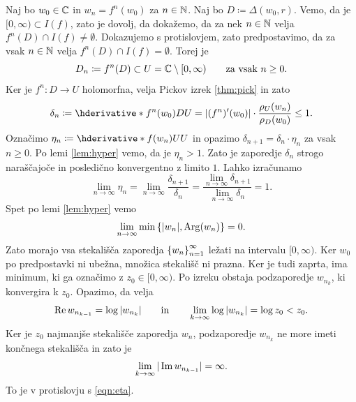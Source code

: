 \begin{dokaz}
    Naj bo \(w_0 \in \mathbb C\) in \(w_n = f^n (w_0)\) za \(n \in \mathbb N\). Naj bo \(D \coloneq \Delta (w_0, r)\). Vemo, da je \([0, \infty) \subset I (f)\), zato je dovolj, da dokažemo, da za nek \(n \in \mathbb N\) velja \(f^n (D) \cap I (f) \neq \emptyset\). Dokazujemo s protislovjem, zato predpostavimo, da za vsak \(n \in \mathbb N\) velja \(f^n (D) \cap I (f) = \emptyset\). Torej je
    \[D_n \coloneq f^n (D) \subset U = \mathbb C \setminus [0, \infty) \qquad \text{za vsak } n \geq 0.\]
    Ker je \(f^n \colon D \to U\) holomorfna, velja Pickov izrek \ref{thm:pick} in zato
    \[\delta_n \coloneq \hder{f^n (w_0)}{D}{U} = |(f^n)' (w_0)| \cdot \frac{\rho_U (w_n)}{\rho_D (w_0)} \leq 1.\]
    Označimo \(\eta_n \coloneq \hder{f (w_n)}{U}{U}\) in opazimo \(\delta_{n + 1} = \delta_n \cdot \eta_n\) za vsak \(n \geq 0\). Po lemi \ref{lem:hyper} vemo, da je \(\eta_n > 1\). Zato je zaporedje \(\delta_n\) strogo naraščajoče in posledično konvergentno z limito \(\num{1}\). Lahko izračunamo
    \[\lim_{n \to \infty} \eta_n = \lim_{n \to \infty} \frac{\delta_{n + 1}}{\delta_n} = \frac{\lim_{n \to \infty} \delta_{n + 1}}{\lim_{n \to \infty} \delta_n} = 1.\]
    Spet po lemi \ref{lem:hyper} vemo
    \[\lim_{n \to \infty} \min \left\{ |w_n|, \operatorname{Arg} (w_n) \right\} = 0.\]
    Zato morajo vsa stekališča zaporedja \(\left\{ w_n \right\}_{n = 1}^{\infty}\) ležati na intervalu \([0, \infty)\). Ker \(w_0\) po predpostavki ni ubežna, množica stekališč ni prazna. Ker je tudi zaprta, ima minimum, ki ga označimo z \(z_0 \in [0, \infty)\). Po izreku obstaja podzaporedje \(w_{n_{k}}\), ki konvergira k \(z_0\). Opazimo, da velja
    \[\operatorname{Re} w_{n_{k - 1}} = \log |w_{n_{k}}| \qquad \text{in} \qquad \lim_{k \to \infty} \log |w_{n_{k}}| = \log z_0 < z_0.\]
    Ker je \(z_0\) najmanjše stekališče zaporedja \(w_n\), podzaporedje \(w_{n_{k}}\) ne more imeti končnega stekališča in zato je
    \[\lim_{k \to \infty} |\operatorname{Im} w_{n_{k-1}}| = \infty.\]
    To je v protislovju s \eqref{eqn:eta}.
\end{dokaz}



